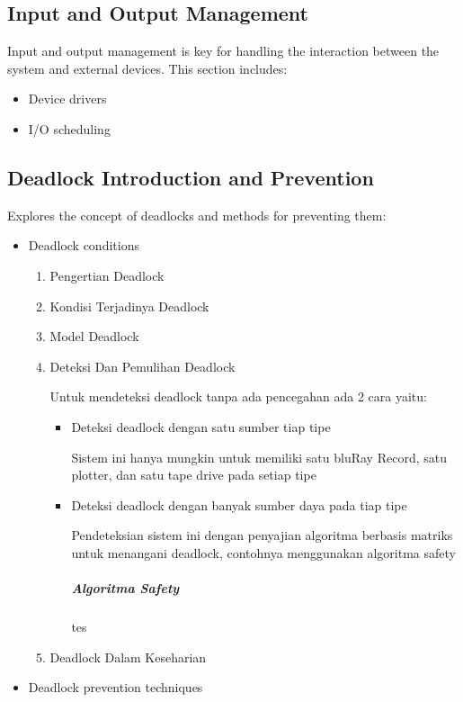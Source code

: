 \documentclass[12pt]{article}
\begin{document}
\subsection{Input and Output Management}
Input and output management is key for handling the interaction between the system and external devices. This section includes:
\begin{itemize}
    \item Device drivers
    \item I/O scheduling
\end{itemize}

\subsection{Deadlock Introduction and Prevention}
Explores the concept of deadlocks and methods for preventing them:
\begin{itemize}
    \item Deadlock conditions
    \begin{enumerate}
        \item Pengertian Deadlock
        \item Kondisi Terjadinya Deadlock
        \item Model Deadlock
        \item Deteksi Dan Pemulihan Deadlock
        \par Untuk mendeteksi deadlock tanpa ada pencegahan ada 2 cara yaitu: \par
        \begin{itemize}
            \item Deteksi deadlock dengan satu sumber tiap tipe
            \par Sistem ini hanya mungkin untuk memiliki satu bluRay Record, satu plotter, dan satu tape drive pada setiap tipe
            \item Deteksi deadlock dengan banyak sumber daya pada tiap tipe
            \par Pendeteksian sistem ini dengan penyajian algoritma berbasis matriks untuk menangani deadlock, contohnya menggunakan algoritma safety
            \newline
            \subparagraph{Algoritma Safety}
            \par tes
        \end{itemize}
        \item Deadlock Dalam Keseharian
    \end{enumerate}
    \item Deadlock prevention techniques
\end{itemize}
\end{document}
